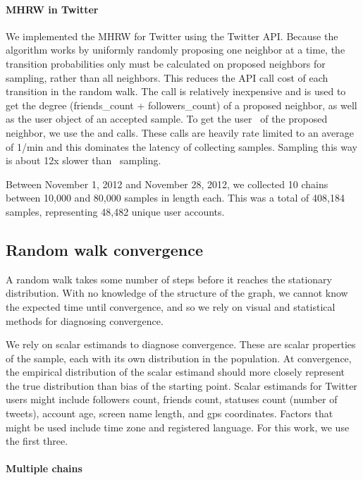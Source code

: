 \paragraph{MHRW in Twitter}

We implemented the MHRW for Twitter using the Twitter API. Because the
algorithm works by uniformly randomly proposing one neighbor at a
time, the transition probabilities only must be calculated on proposed
neighbors for sampling, rather than all neighbors. This reduces the
API call cost of each transition in the random walk. The
 call is relatively inexpensive and is used to get the
degree (friends\_count + followers\_count) of a proposed neighbor, as well
as the user object of an accepted sample. To get the user \id~of the
proposed neighbor, we use the  and  calls.
These calls are heavily rate limited to an average of 1/min and this
dominates the latency of collecting samples. Sampling this way is
about 12x slower than \id~sampling.

Between November 1, 2012 and November 28, 2012, we collected 10 chains
between 10,000 and 80,000 samples in length each. This was a total of
408,184 samples, representing 48,482 unique user accounts.

\subsection{Random walk convergence}

A random walk takes some number of steps before it reaches the
stationary distribution.
With no knowledge of the structure of the graph, we cannot know the
expected time until convergence, and so we rely on visual and
statistical methods for diagnosing convergence.

We rely on scalar estimands to diagnose convergence. These are scalar
properties of the sample, each with its own distribution in the
population. At convergence, the empirical distribution of the scalar
estimand should more closely represent the true distribution than bias
of the starting point. Scalar estimands for Twitter users might
include followers count, friends count, statuses count (number of
tweets), account age, screen name length, and gps coordinates. Factors
that might be used include time zone and registered language.
For this work, we use the first three.

\paragraph{Multiple chains}

